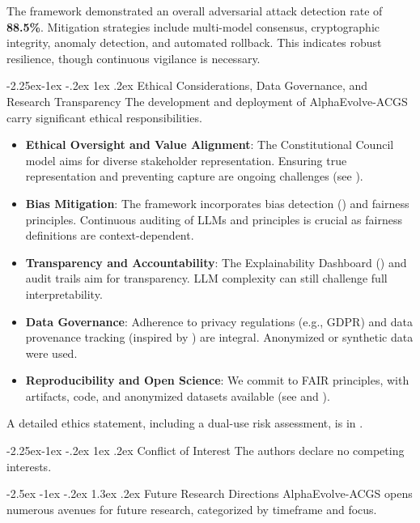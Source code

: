 \documentclass[manuscript,screen,review,anonymous,9pt]{acmart}
\makeatletter
\renewcommand\section{\@startsection{section}{1}{\z@}%
  {-2.5ex \@plus -1ex \@minus -.2ex}%
  {1.3ex \@plus.2ex}%
  {\normalfont\Large\bfseries}}
\renewcommand\subsection{\@startsection{subsection}{2}{\z@}%
  {-2.25ex\@plus -1ex \@minus -.2ex}%
  {1ex \@plus .2ex}%
  {\normalfont\large\bfseries}}
\makeatother
\begin{document}
The framework demonstrated an overall adversarial attack detection rate of \textbf{88.5\%}. Mitigation strategies include multi-model consensus, cryptographic integrity, anomaly detection, and automated rollback. This indicates robust resilience, though continuous vigilance is necessary.

\subsection{Ethical Considerations, Data Governance, and Research Transparency}
\label{subsec:ethics_governance_reproducibility} 
The development and deployment of AlphaEvolve-ACGS carry significant ethical responsibilities.
\begin{itemize}[leftmargin=*,itemsep=1pt,parsep=1pt]
    \item \textbf{Ethical Oversight and Value Alignment}: The Constitutional Council model aims for diverse stakeholder representation. Ensuring true representation and preventing capture are ongoing challenges (see ).
    \item \textbf{Bias Mitigation}: The framework incorporates bias detection () and fairness principles. Continuous auditing of LLMs and principles is crucial as fairness definitions are context-dependent.
    \item \textbf{Transparency and Accountability}: The Explainability Dashboard () and audit trails aim for transparency. LLM complexity can still challenge full interpretability.
    \item \textbf{Data Governance}: Adherence to privacy regulations (e.g., GDPR) and data provenance tracking (inspired by \cite{Gebru2021DatasheetDatasets}) are integral. Anonymized or synthetic data were used.
    \item \textbf{Reproducibility and Open Science}: We commit to FAIR principles, with artifacts, code, and anonymized datasets available (see  and ).
\end{itemize}
A detailed ethics statement, including a dual-use risk assessment, is in .

\subsection{Conflict of Interest}
The authors declare no competing interests.

\section{Future Research Directions}
\label{sec:future_work}
AlphaEvolve-ACGS opens numerous avenues for future research, categorized by timeframe and focus.
\end{document}
